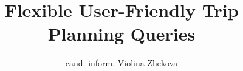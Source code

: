 
\title{Flexible User-Friendly Trip Planning Queries}
\author{cand. inform. Violina Zhekova}

\maketitle